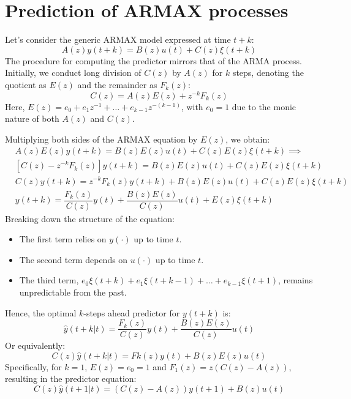 \section{Prediction of ARMAX processes}

Let's consider the generic ARMAX model expressed at time $t+k$: 
\[A(z)y(t+k)=B(z)u(t)+C(z)\xi(t+k)\]
The procedure for computing the predictor mirrors that of the ARMA process.
Initially, we conduct long division of $C(z)$ by $A(z)$ for $k$ steps, denoting the quotient as $E(z)$  and the remainder as $F_k(z)$: 
\[C(z) = A(z)E(z) + z^{-k} F_k(z)\]
Here, $E(z) = e_0 + e_1z^{-1} + \dots + e_{k-1}z^{-(k-1)}$, with $e_0 = 1$ due to the monic nature of both $A(z)$ and $C(z)$. 

Multiplying both sides of the ARMAX equation by $E(z)$, we obtain:
\begin{align*}
    &A(z)E(z)y(t+k) = B(z)E(z)u(t) + C(z)E(z)\xi(t+k) \implies \\
    &[C(z) - z^{-k} F_k(z)] y(t+k) = B(z)E(z)u(t) + C(z)E(z)\xi(t+k) \\
    &C(z)y(t+k) = z^{-k} F_k(z)y(t+k) + B(z)E(z)u(t) + C(z)E(z)\xi(t+k) \\
    &y(t+k)=\dfrac{F_k(z)}{C(z)}y(t) + \dfrac{B(z)E(z)}{C(z)}u(t) + E(z)\xi(t+k)
\end{align*}
Breaking down the structure of the equation:
\begin{itemize}
    \item The first term relies on $y(\cdot)$ up to time $t$. 
    \item The second term depends on $u(\cdot)$ up to time $t$.
    \item The third term, $e_0\xi(t+k) + e_1\xi(t+k-1) + \dots + e_{k-1}\xi(t+1)$, remains unpredictable from the past.
\end{itemize}
Hence, the optimal $k$-steps ahead predictor for $y(t+k)$ is:
\[\hat{y}(t+k|t)=\dfrac{F_k(z)}{C(z)}y(t) + \dfrac{B(z)E(z)}{C(z)}u(t)\]
Or equivalently: 
\[C(z)\hat{y}(t+k|t) = Fk(z)y(t) + B(z)E(z)u(t) \]
Specifically, for $k = 1$, $E(z) = e_0 = 1$ and $F_1(z) = z(C(z) - A(z))$, resulting in the predictor equation:
\[C(z)\hat{y}(t+1|t) = (C(z) - A(z))y(t+1) + B(z)u(t)\]